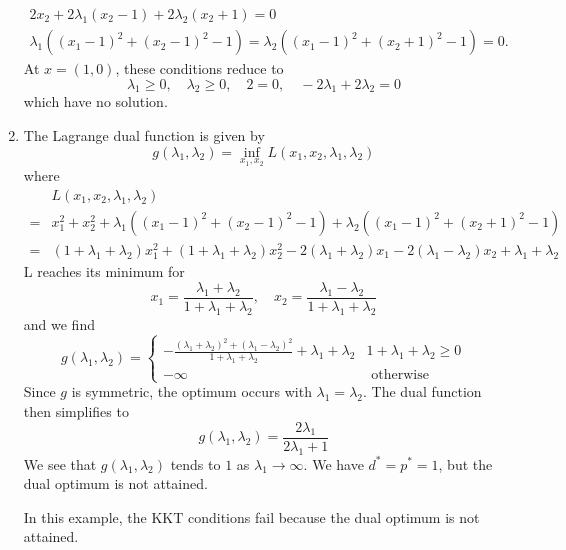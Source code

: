 \begin{problem}[5.26]
\begin{enumerate}
\[\begin{array}{c}
            2 x_{2}+2 \lambda_{1}\left(x_{2}-1\right)+2 \lambda_{2}\left(x_{2}+1\right)=0 \\
            \lambda_{1}\left(\left(x_{1}-1\right)^{2}+\left(x_{2}-1\right)^{2}-1\right)=\lambda_{2}\left(\left(x_{1}-1\right)^{2}+\left(x_{2}+1\right)^{2}-1\right)=0 .
            \end{array}\] At $x = (1,0)$, these conditions reduce to\[\lambda_{1} \geq 0, \quad \lambda_{2} \geq 0, \quad 2=0, \quad-2 \lambda_{1}+2 \lambda_{2}=0\] which have no solution.
        \item The Lagrange dual function is given by\[g\left(\lambda_{1}, \lambda_{2}\right)=\inf _{x_{1}, x_{2}} L\left(x_{1}, x_{2}, \lambda_{1}, \lambda_{2}\right)\] where \begin{align*}
            &L\left(x_{1}, x_{2}, \lambda_{1}, \lambda_{2}\right) \\
            =&x_{1}^{2}+x_{2}^{2}+\lambda_{1}\left(\left(x_{1}-1\right)^{2}+\left(x_{2}-1\right)^{2}-1\right)+\lambda_{2}\left(\left(x_{1}-1\right)^{2}+\left(x_{2}+1\right)^{2}-1\right) \\
            =&\left(1+\lambda_{1}+\lambda_{2}\right) x_{1}^{2}+\left(1+\lambda_{1}+\lambda_{2}\right) x_{2}^{2}-2\left(\lambda_{1}+\lambda_{2}\right) x_{1}-2\left(\lambda_{1}-\lambda_{2}\right) x_{2}+\lambda_{1}+\lambda_{2}
        \end{align*}
        L reaches its minimum for \[x_{1}=\frac{\lambda_{1}+\lambda_{2}}{1+\lambda_{1}+\lambda_{2}}, \quad x_{2}=\frac{\lambda_{1}-\lambda_{2}}{1+\lambda_{1}+\lambda_{2}}\] and we find \[g\left(\lambda_{1}, \lambda_{2}\right)=\left\{\begin{array}{ll}
            -\frac{\left(\lambda_{1}+\lambda_{2}\right)^{2}+\left(\lambda_{1}-\lambda_{2}\right)^{2}}{1+\lambda_{1}+\lambda_{2}}+\lambda_{1}+\lambda_{2} & 1+\lambda_{1}+\lambda_{2} \geq 0 \\
            -\infty & \text { otherwise }
        \end{array}\right.\]
        Since $g$ is symmetric, the optimum occurs with $\lambda_1 = \lambda_2$. The dual function then simplifies to\[g(\lambda_1, \lambda_2) = \frac{2\lambda_1}{2\lambda_1 + 1}\] 
        We see that $g(\lambda_1, \lambda_2)$ tends to $1$ as $\lambda_1 \to \infty$. We have $d^* = p^* = 1$, but the dual optimum is not attained.

        In this example, the KKT conditions fail because the dual optimum is not attained.
    \end{enumerate}
\end{problem}

